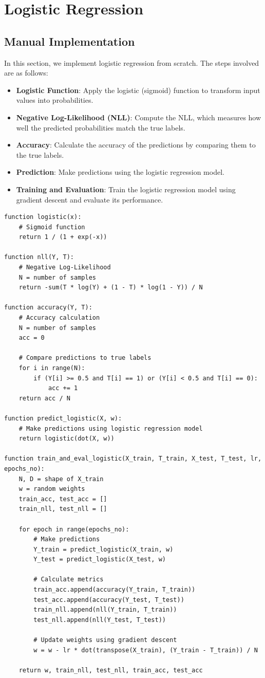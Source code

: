 \documentclass[a4paper,12pt]{article}
\begin{document}
\section{Logistic Regression}

\subsection{Manual Implementation}
In this section, we implement logistic regression from scratch. The steps involved are as follows:

\begin{itemize}
    \item \textbf{Logistic Function}: Apply the logistic (sigmoid) function to transform input values into probabilities.
    \item \textbf{Negative Log-Likelihood (NLL)}: Compute the NLL, which measures how well the predicted probabilities match the true labels.
    \item \textbf{Accuracy}: Calculate the accuracy of the predictions by comparing them to the true labels.
    \item \textbf{Prediction}: Make predictions using the logistic regression model.
    \item \textbf{Training and Evaluation}: Train the logistic regression model using gradient descent and evaluate its performance.
\end{itemize}

\begin{verbatim}
function logistic(x):
    # Sigmoid function
    return 1 / (1 + exp(-x))

function nll(Y, T):
    # Negative Log-Likelihood
    N = number of samples
    return -sum(T * log(Y) + (1 - T) * log(1 - Y)) / N

function accuracy(Y, T):
    # Accuracy calculation
    N = number of samples
    acc = 0

    # Compare predictions to true labels
    for i in range(N):
        if (Y[i] >= 0.5 and T[i] == 1) or (Y[i] < 0.5 and T[i] == 0):
            acc += 1
    return acc / N

function predict_logistic(X, w):
    # Make predictions using logistic regression model
    return logistic(dot(X, w))

function train_and_eval_logistic(X_train, T_train, X_test, T_test, lr, epochs_no):
    N, D = shape of X_train
    w = random weights
    train_acc, test_acc = []
    train_nll, test_nll = []

    for epoch in range(epochs_no):
        # Make predictions
        Y_train = predict_logistic(X_train, w)
        Y_test = predict_logistic(X_test, w)

        # Calculate metrics
        train_acc.append(accuracy(Y_train, T_train))
        test_acc.append(accuracy(Y_test, T_test))
        train_nll.append(nll(Y_train, T_train))
        test_nll.append(nll(Y_test, T_test))

        # Update weights using gradient descent
        w = w - lr * dot(transpose(X_train), (Y_train - T_train)) / N

    return w, train_nll, test_nll, train_acc, test_acc
\end{verbatim}
\end{document}
